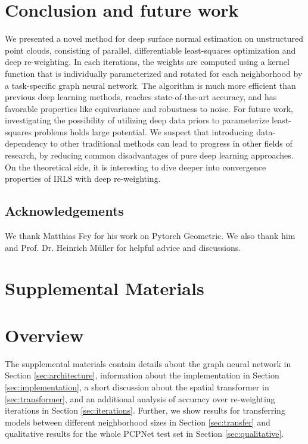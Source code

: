 \documentclass[10pt,twocolumn,letterpaper]{article}
\begin{document}
\section{Conclusion and future work}
We presented a novel method for deep surface normal estimation on unstructured point clouds, consisting of parallel, differentiable least-squares optimization and deep re-weighting. In each iterations, the weights are computed using a kernel function that is individually parameterized and rotated for each neighborhood by a task-specific graph neural network. The algorithm is much more efficient than previous deep learning methods, reaches state-of-the-art accuracy, and has favorable properties like equivariance and robustness to noise. For future work, investigating the possibility of utilizing deep data priors to parameterize least-squares problems holds large potential. We suspect that introducing data-dependency to other traditional methods can lead to progress in other fields of research, by reducing common disadvantages of pure deep learning approaches. On the theoretical side, it is interesting to dive deeper into convergence properties of IRLS with deep re-weighting. 

\subsection*{Acknowledgements}
We thank Matthias Fey for his work on Pytorch Geometric. We also thank him and Prof. Dr. Heinrich M\"uller for helpful advice and discussions.

{\small


}


\appendix
\section*{Supplemental Materials}
\section{Overview}
The supplemental materials contain details about the graph neural network in Section \ref{sec:architecture}, information about the implementation in Section \ref{sec:implementation}, a short discussion about the spatial transformer in \ref{sec:transformer}, and an additional analysis of accuracy over re-weighting iterations in Section \ref{sec:iterations}. Further, we show results for transferring models between different neighborhood sizes in Section \ref{sec:transfer} and qualitative results for the whole PCPNet test set in Section \ref{sec:qualitative}.
\end{document}
